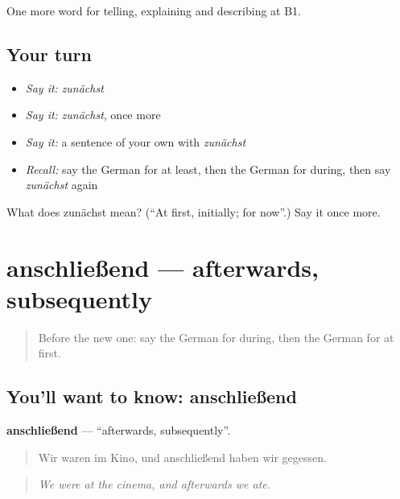 \begin{grammarlens}[title={What you've built}]
One more word for telling, explaining and describing at B1.
\end{grammarlens}

\subsection*{Your turn}
\begin{itemize}
\raggedright
  \item \emph{Say it:} \emph{zunächst}
  \item \emph{Say it:} \emph{zunächst}, once more
  \item \emph{Say it:} a sentence of your own with \emph{zunächst}
  \item \emph{Recall:} say the German for at least, then the German for during, then say \emph{zunächst} again
\end{itemize}

\begin{tcolorbox}[breakable,colback=teal!4,colframe=teal!35!black,title={Before you move on}]
What does zunächst mean? (\textquotedblleft{}At first, initially; for now\textquotedblright{}.) Say it once more.
\end{tcolorbox}
\section[anschließend]{anschließend — afterwards, subsequently}

\label{lesson:GE-C262-anschliessend}



\begin{quote}
Before the new one: say the German for during, then the German for at first.
\end{quote}

\subsection*{You'll want to know: anschließend}
\textbf{anschließend} — \textquotedblleft{}afterwards, subsequently\textquotedblright{}.

\begin{quote}
Wir waren im Kino, und anschließend haben wir gegessen.
\end{quote}

\begin{quote}
\emph{We were at the cinema, and afterwards we ate.}
\end{quote}

